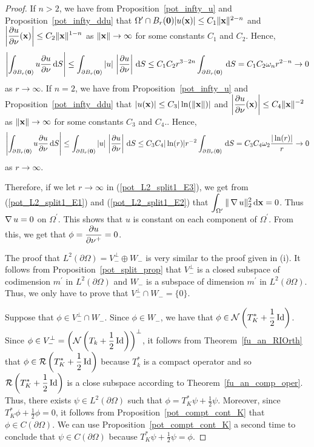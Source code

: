 \begin{proof}
If $n>2$, we have from Proposition~\ref{pot_infty_u} and
Proposition~\ref{pot_infty_ddu} that
$\Omega^{\prime} \cap B_r(\mathbf{0})|u(\mathbf{x})| \leq C_1\|\mathbf{x}\|^{2-n}$ and
$\displaystyle \left| \frac{\partial{u}}{\partial \mathbf{\nu}}(\mathbf{x})\right| \leq
C_2 \|\mathbf{x}\|^{1-n}$ as $\|\mathbf{x}\| \rightarrow \infty$ for some
constants $C_1$ and $C_2$.  Hence,
\[
\left| \int_{\partial B_r(\mathbf{0})} u \frac{\partial{u}}{\partial \mathbf{\nu}} \,\mathrm{d}{S} \right|
\leq \int_{\partial B_r(\mathbf{0})} |u|\,\left|\frac{\partial{u}}{\partial \mathbf{\nu}} \right| \,\mathrm{d}{S}
\leq C_1C_2 r^{3-2n} \int_{\partial B_r(\mathbf{0})} \,\mathrm{d}{S}
= C_1C_2 \omega_n r^{2-n}  \to 0 
\]
as $r \to \infty$.
If $n=2$, we have from Proposition~\ref{pot_infty_u} and
Proposition~\ref{pot_infty_ddu} that
$|u(\mathbf{x})| \leq C_3|\ln(\|\mathbf{x}\|)|$ and
$\displaystyle \left| \frac{\partial{u}}{\partial \mathbf{\nu}}(\mathbf{x})\right| \leq
C_4 \|\mathbf{x}\|^{-2}$ as $\|\mathbf{x}\| \rightarrow \infty$ for some
constants $C_3$ and $C_4$..  Hence,
\[
\left| \int_{\partial B_r(\mathbf{0})} u \frac{\partial{u}}{\partial \mathbf{\nu}} \,\mathrm{d}{S} \right|
\leq \int_{\partial B_r(\mathbf{0})} |u|\,\left|\frac{\partial{u}}{\partial \mathbf{\nu}} \right| \,\mathrm{d}{S}
\leq C_3C_4 |\ln(r)| r^{-2} \int_{\partial B_r(\mathbf{0})} \,\mathrm{d}{S}
= C_3C_4 \omega_2 \frac{|\ln(r)|}r \to 0 
\]
as $r \to \infty$.

Therefore, if we let $r \to \infty$ in (\ref{pot_L2_split1_E3}), we
get from (\ref{pot_L2_split1_E1}) and (\ref{pot_L2_split1_E2}) that
$\displaystyle \int_{\Omega^{\prime}} \|\operatorname{\nabla} u\|_2^2 \,\mathrm{d}{\mathbf{x}} = 0$.
Thus $\operatorname{\nabla} u = 0$ on $\displaystyle \Omega^{\prime}$.  This shows that $u$ is
constant on each component of $\displaystyle \Omega^{\prime}$.  From
this, we get that $\displaystyle \phi = \frac{\partial{u}}{\partial \mathbf{\nu}^+} = 0$.

 The proof that
$\displaystyle L^2(\partial \Omega) = V_-^\perp \oplus W_-$ is very
similar to the proof given in (i). It
follows from Proposition~\ref{pot_split_prop} that $V_-^\perp$ is a
closed subspace of codimension $\displaystyle m^{\prime}$ in
$\displaystyle L^2(\partial \Omega)$ and $W_-$
is a subspace of dimension $\displaystyle m^{\prime}$ in
$\displaystyle L^2(\partial \Omega)$.  Thus, we
only have to prove that $\displaystyle V_-^\perp \cap W_- = \{0\}$.

Suppose that $\displaystyle \phi \in V_-^\perp \cap W_-$.
Since $\phi \in W_-$, we have that
$\displaystyle \phi \in \mathcal{N} \left(T^\ast_K + \frac{1}{2} \operatorname{Id}\right)$.
Since $\displaystyle \phi \in V_-^\perp
= \left(\mathcal{N} \left(T_k + \frac{1}{2} \operatorname{Id}\right)\right)^\perp$,
it follows from Theorem~\ref{fu_an_RIOrth} that
$\displaystyle \phi \in \mathcal{R} \left( T^\ast_K + \frac{1}{2} \operatorname{Id}\right)$ because
$\displaystyle T_k^\ast$ is a compact operator
and so $\displaystyle \mathcal{R} \left( T^\ast_K + \frac{1}{2} \operatorname{Id}\right)$
is a close subspace according to Theorem~\ref{fu_an_comp_oper}.  Thus, there
exists $\displaystyle \psi \in L^2(\partial \Omega)$ such that
$\displaystyle \phi = T^\ast_K \psi + \frac{1}{2} \psi$.  Moreover,
since $\displaystyle T^\ast_K\phi + \frac{1}{2} \phi = 0$, it follows
from Proposition~\ref{pot_compt_cont_K} that
$\phi \in C(\partial \Omega)$.  We can use 
Proposition~\ref{pot_compt_cont_K} a second time to conclude that
$\psi \in C(\partial \Omega)$ because
$\displaystyle T^\ast_K \psi + \frac{1}{2} \psi = \phi$.


\end{proof}
